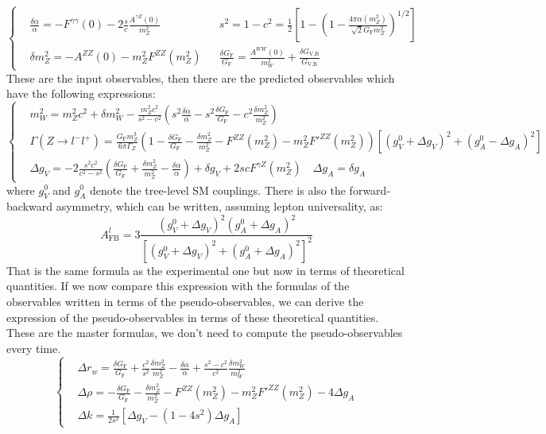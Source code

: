 \documentclass[../main.tex]{subfiles}
\begin{document}
\[
\left\{
\begin{aligned}
&\frac{\delta\alpha}{\alpha}=-F^{\gamma\gamma}(0)-2\frac{s}{c}\frac{A^{\gamma Z}(0)}{m_Z^2} &&s^2=1-c^2=\frac{1}{2}\left[1-\left(1-\frac{4\pi\alpha(m_Z^2)}{\sqrt{2}G_{\text{F}}m_Z^2}\right)^{1/2}\right]\\
&\delta m_Z^2=-A^{ZZ}(0)-m_Z^2F^{ZZ}(m_Z^2) &&\frac{\delta G_{\text{F}}}{G_{\text{F}}}=\frac{A^{WW}(0)}{m_W^2}+\frac{\delta G_{\text{V,B}}}{G_{\text{V,B}}}
\end{aligned}
\right.
\]
These are the input observables, then there are the predicted observables which have the following expressions:
\[
\left\{
\begin{aligned}
&m_W^2=m_Z^2c^2+\delta m_W^2-\frac{m_Z^2c^2}{s^2-c^2} \left(s^2\frac{\delta\alpha}{\alpha}-s^2\frac{\delta G_{\text{F}}}{G_{\text{F}}}-c^2\frac{\delta m_Z^2}{m_Z^2}\right)\\
&\Gamma(Z\to l^-l^+)=\frac{G_{\text{F}}m_Z^3}{6\pi\Gamma_Z}\left(1-\frac{\delta G_{\text{F}}}{G_{\text{F}}}-\frac{\delta m_Z^2}{m_Z^2}-F^{ZZ}(m_Z^2)-m_Z^2F'^{ZZ}(m_Z^2)\right)\left[(g_V^0+\Delta g_V)^2+(g_A^0-\Delta g_A)^2\right]\\
&\Delta g_V=-2\frac{s^2c^2}{c^2-s^2}\left(\frac{\delta G_{\text{F}}}{G_{\text{F}}}+\frac{\delta m_Z^2}{m_Z^2}-\frac{\delta\alpha}{\alpha}\right)+\delta g_V+2scF^{\gamma Z}(m_Z^2) \quad \Delta g_A=\delta g_A
\end{aligned}
\right.
\]
where $g_V^0$ and $g_A^0$ denote the tree-level SM couplings. There is also the forward-backward asymmetry, which can be written, assuming lepton universality, as:
\[
A_{\text{FB}}^l=3\frac{(g_V^0+\Delta g_V)^2(g_A^0+\Delta g_A)^2}{\left[(g_V^0+\Delta g_V)^2+(g_A^0+\Delta g_A)^2\right]^2}
\]
That is the same formula as the experimental one but now in terms of theoretical quantities. If we now compare this expression with the formulas of the observables written in terms of the pseudo-observables, we can derive the expression of the pseudo-observables in terms of these theoretical quantities. These are the master formulas, we don't need to compute the pseudo-observables every time. 
\[
\left\{
\begin{aligned}
&\Delta r_w=\frac{\delta G_{\text{F}}}{G_{\text{F}}}+\frac{c^2}{s^2}\frac{\delta m_Z^2}{m_Z^2}-\frac{\delta\alpha}{\alpha}+\frac{s^2-c^2}{c^2}\frac{\delta m_W^2}{m_W^2}\\
&\Delta\rho=-\frac{\delta G_{\text{F}}}{G_{\text{F}}}-\frac{\delta m_Z^2}{m_Z^2}-F^{ZZ}(m_Z^2)-m_Z^2F'^{ZZ}(m_Z^2)-4\Delta g_A\\
&\Delta k=\frac{1}{2s^2}[\Delta g_V-(1-4s^2)\Delta g_A]
\end{aligned}
\right.
\]
\end{document}
